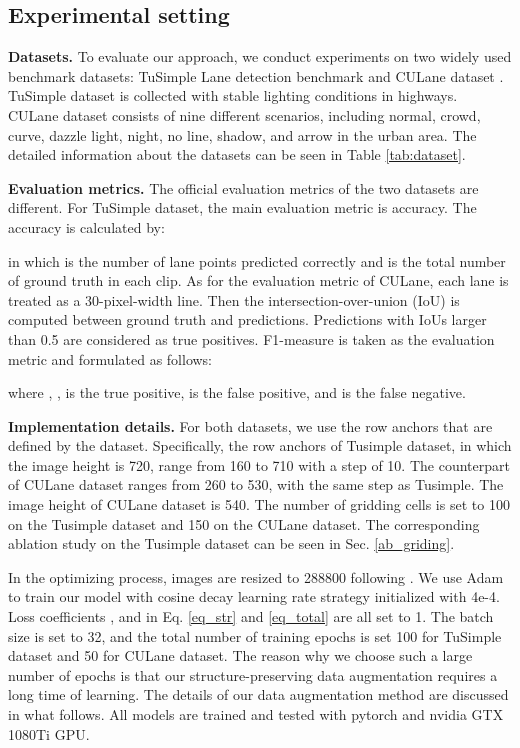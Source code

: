 \documentclass[runningheads]{llncs}
\begin{document}
\subsection{Experimental setting}
\label{sec_setting}

\noindent
\textbf{Datasets.} To evaluate our approach, we conduct experiments on two widely used benchmark datasets: TuSimple Lane detection benchmark \cite{tusimple} and CULane dataset \cite{SCNN}. TuSimple dataset is collected with stable lighting conditions in highways. CULane dataset consists of nine different scenarios, including normal, crowd, curve, dazzle light, night, no line, shadow, and arrow in the urban area. The detailed information about the datasets can be seen in Table \ref{tab:dataset}.

\noindent
\textbf{Evaluation metrics.} The official evaluation metrics of the two datasets are different. For TuSimple dataset, the main evaluation metric is accuracy. The accuracy is calculated by: 

in which  is the number of lane points predicted correctly and  is the total number of ground truth in each clip.
As for the evaluation metric of CULane, each lane is treated as a 30-pixel-width line. Then the intersection-over-union (IoU) is computed between ground truth and predictions. Predictions with IoUs larger than 0.5 are considered as true positives. F1-measure is taken as the evaluation metric and formulated as follows:

where ,  ,  is the true positive,  is the false positive, and  is the false negative.

\noindent
\textbf{Implementation details.} For both datasets, we use the row anchors that are defined by the dataset. Specifically, the row anchors of Tusimple dataset, in which the image height is 720, range from 160 to 710 with a step of 10. The counterpart of CULane dataset ranges from 260 to 530, with the same step as Tusimple. The image height of CULane dataset is 540. The number of gridding cells is set to 100 on the Tusimple dataset and 150 on the CULane dataset. The corresponding ablation study on the Tusimple dataset can be seen in Sec. \ref{ab_griding}. 

In the optimizing process, images are resized to 288800 following \cite{SCNN}. We use Adam \cite{kingma2014adam} to train our model with cosine decay learning rate strategy \cite{loshchilov2016sgdr} initialized with 4e-4. Loss coefficients ,  and  in Eq. \ref{eq_str} and \ref{eq_total} are all set to 1. The batch size is set to 32, and the total number of training epochs is set 100 for TuSimple dataset and 50 for CULane dataset. The reason why we choose such a large number of epochs is that our structure-preserving data augmentation requires a long time of learning. The details of our data augmentation method are discussed in what follows. All models are trained and tested with pytorch \cite{paszke2017automatic} and nvidia GTX 1080Ti GPU. 
\end{document}
